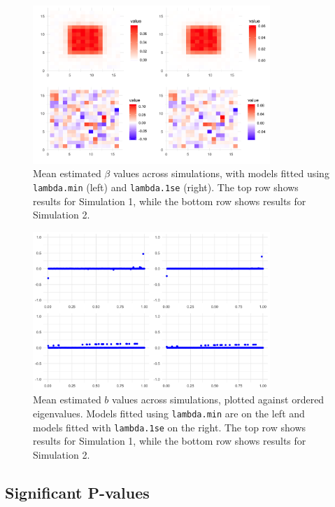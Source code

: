 \documentclass[12pt]{article}
\begin{document}
\begin{figure}[h!]
	\centering
	\includegraphics[width=0.8\textwidth]{beta_estimates.png}
	\caption{Mean estimated \( \beta \) values across simulations, with models fitted using \texttt{lambda.min} (left) and
		\texttt{lambda.1se} (right). The top row shows results for Simulation 1, while the bottom row shows results for Simulation 2.}
	\label{fig:beta_estimates}
\end{figure}

\begin{figure}[h!]
	\centering
	\includegraphics[width=0.8\textwidth]{b_estimates.png}
	\caption{Mean estimated \( b \) values across simulations, plotted against ordered eigenvalues. Models fitted using
		\texttt{lambda.min} are on the left and models fitted with \texttt{lambda.1se} on the right. The top row shows results for Simulation 1, while the bottom row shows results for Simulation 2.}
	\label{fig:b_estimates}
\end{figure}

\FloatBarrier

\subsection*{Significant P-values}
\end{document}
